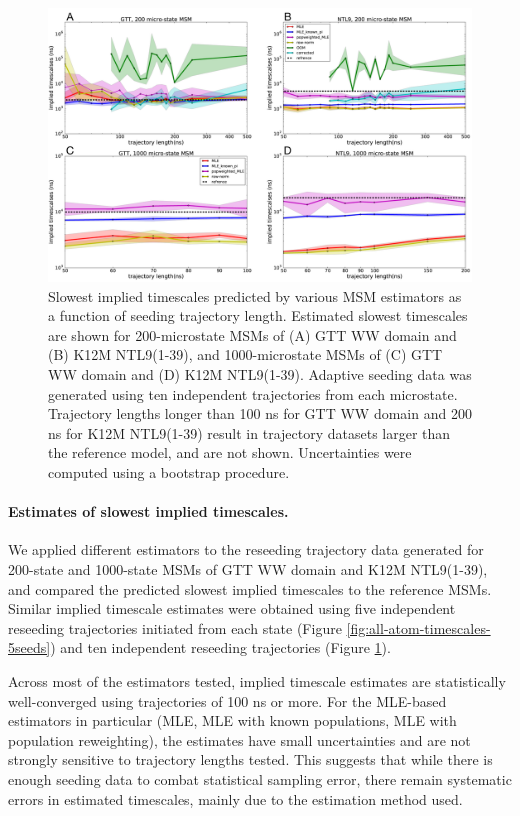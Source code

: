 \documentclass[%
 aip,
rsi,%
 amsmath,amssymb,
 reprint,%
]{revtex4-1}
\begin{document}
\begin{figure}[ht!]
\includegraphics[width=0.55\paperwidth]{figures/NTL9_GTT/SI/all_slowest_timescales_cluster_200_and_1000_10trajs_omi.pdf}%
\caption{Slowest implied timescales predicted by various MSM estimators as a function of seeding trajectory length. Estimated slowest timescales are shown for 200-microstate MSMs of (A) GTT WW domain and (B) K12M NTL9(1-39), and 1000-microstate MSMs of (C) GTT WW domain and (D) K12M NTL9(1-39). Adaptive seeding data was generated using ten independent trajectories from each microstate. Trajectory lengths longer than 100 ns for GTT WW domain and 200 ns for K12M NTL9(1-39) result in trajectory datasets larger than the reference model, and are not shown. Uncertainties were computed using a bootstrap procedure. }
\label{fig:all-atom-timescales-10seeds}
\end{figure}



\paragraph{Estimates of slowest implied timescales.}

We applied different estimators to the reseeding trajectory data generated for 200-state and 1000-state MSMs of GTT WW domain and K12M NTL9(1-39), and compared the predicted slowest implied timescales to the reference MSMs. Similar implied timescale estimates were obtained using five independent reseeding trajectories initiated from each state (Figure \ref{fig:all-atom-timescales-5seeds}) and ten independent reseeding trajectories (Figure \ref{fig:all-atom-timescales-10seeds}).

Across most of the estimators tested, implied timescale estimates are statistically well-converged using trajectories of 100 ns or more.  For the MLE-based estimators in particular (MLE, MLE with known populations, MLE with population reweighting), the estimates have small uncertainties and are not strongly sensitive to trajectory lengths tested. This suggests that while there is enough seeding data to combat statistical sampling error, there remain systematic errors in estimated timescales, mainly due to the estimation method used.
\end{document}
